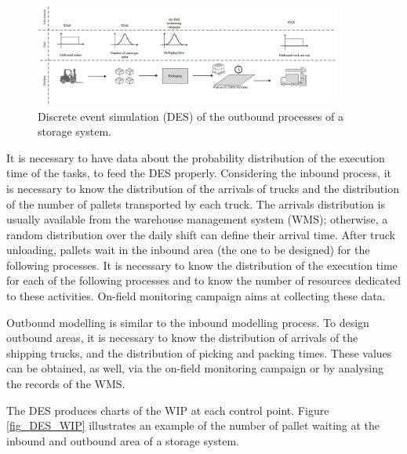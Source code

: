 \begin{figure}[hbt!]
\centering
\includegraphics[width=0.9\textwidth]{SectionWarehouses/design_figures/fig_DES_outbound.png}
\captionsetup{type=figure}
\caption{Discrete event simulation (DES) of the outbound processes of a storage system.}
\label{fig_DES_outbound}
\end{figure}

It is necessary to have data about the probability distribution of the execution time of the tasks, to feed the DES properly. Considering the inbound process, it is necessary to know the distribution of the arrivals of trucks and the distribution of the number of pallets transported by each truck. The arrivals distribution is usually available from the warehouse management system (WMS); otherwise, a random distribution over the daily shift can define their arrival time. After truck unloading, pallets wait in the inbound area (the one to be designed) for the following processes. It is necessary to know the distribution of the execution time for each of the following processes and to know the number of resources dedicated to these activities. On-field monitoring campaign aims at collecting these data. \par

Outbound modelling is similar to the inbound modelling process. To design outbound areas, it is necessary to know the distribution of arrivals of the shipping trucks, and the distribution of picking and packing times. These values can be obtained, as well, via the on-field monitoring campaign or by analysing the records of the WMS.\par

The DES produces charts of the WIP at each control point. Figure \ref{fig_DES_WIP} illustrates an example of the number of pallet waiting at the inbound and outbound area of a storage system.\par

